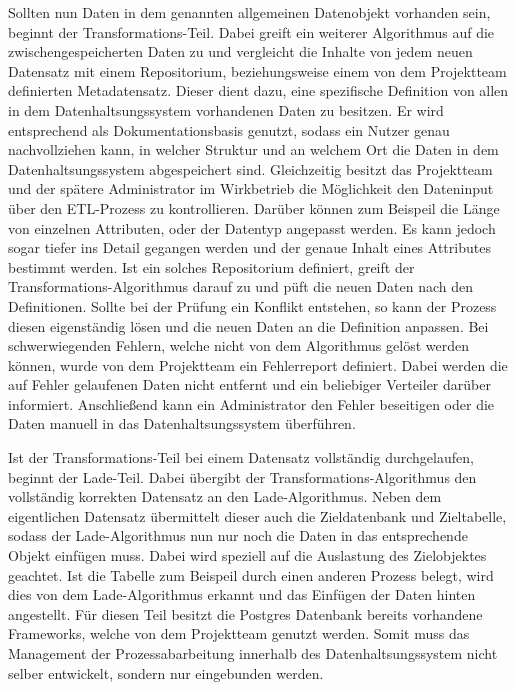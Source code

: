 Sollten nun Daten in dem genannten allgemeinen Datenobjekt vorhanden sein,
beginnt der Transformations-Teil. Dabei greift ein weiterer Algorithmus auf
die zwischengespeicherten Daten zu und vergleicht die Inhalte von jedem neuen
Datensatz mit einem \gls{Repositorium}, beziehungsweise einem von dem
Projektteam definierten Metadatensatz. Dieser dient dazu, eine spezifische
Definition von allen in dem Datenhaltsungssystem vorhandenen Daten zu besitzen.
Er wird entsprechend als Dokumentationsbasis genutzt, sodass ein Nutzer genau
nachvollziehen kann, in welcher Struktur und an welchem Ort die Daten in dem
Datenhaltsungssystem abgespeichert sind. Gleichzeitig besitzt das Projektteam
und der spätere Administrator im Wirkbetrieb die Möglichkeit den Dateninput
über den ETL-Prozess zu kontrollieren. Darüber können zum Beispeil die Länge
von einzelnen Attributen, oder der Datentyp angepasst werden. Es kann jedoch
sogar tiefer ins Detail gegangen werden und der genaue Inhalt eines Attributes
bestimmt werden. Ist ein solches \gls{Repositorium} definiert, greift der
Transformations-Algorithmus darauf zu und püft die neuen Daten nach den
Definitionen. Sollte bei der Prüfung ein Konflikt entstehen, so kann der
Prozess diesen eigenständig lösen und die neuen Daten an die Definition
anpassen. Bei schwerwiegenden Fehlern, welche nicht von dem Algorithmus
gelöst werden können, wurde von dem Projektteam ein Fehlerreport definiert.
Dabei werden die auf Fehler gelaufenen Daten nicht entfernt und ein
beliebiger Verteiler darüber informiert. Anschließend kann ein Administrator
den Fehler beseitigen oder die Daten manuell in das Datenhaltsungssystem
überführen.

Ist der Transformations-Teil bei einem Datensatz vollständig durchgelaufen,
beginnt der Lade-Teil. Dabei übergibt der Transformations-Algorithmus den
vollständig korrekten Datensatz an den Lade-Algorithmus. Neben dem eigentlichen
Datensatz übermittelt dieser auch die Zieldatenbank und Zieltabelle, sodass
der Lade-Algorithmus nun nur noch die Daten in das entsprechende Objekt
einfügen muss. Dabei wird speziell auf die Auslastung des Zielobjektes
geachtet. Ist die Tabelle zum Beispeil durch einen anderen Prozess belegt,
wird dies von dem Lade-Algorithmus erkannt und das Einfügen der Daten
hinten angestellt. Für diesen Teil besitzt die Postgres Datenbank bereits
vorhandene Frameworks, welche von dem Projektteam genutzt werden. Somit muss
das Management der Prozessabarbeitung innerhalb des Datenhaltsungssystem nicht
selber entwickelt, sondern nur eingebunden werden.
\nl%

